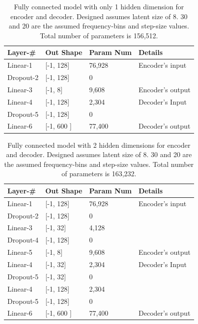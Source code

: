 \documentclass[runningheads,a4paper]{llncs}
\begin{document}
\begin{appendices}
\begin{table}
\begin{tabular}{|p{3cm}|p{3cm}|p{3cm}|p{3cm}|}
\hline
Layer-\# & Out Shape & Param Num & Details  \\ \hline
Linear-1 & [-1, 128]  & 76,928 & Encoder's input \\ \hline
Dropout-2 & [-1, 128] & 0 &  \\ \hline
Linear-3 & [-1, 8] & 9,608 & Encoder's output \\ \hline
Linear-4 & [-1, 128] & 2,304 & Decoder's Input \\ \hline
Dropout-5 & [-1, 128]  & 0 &  \\ \hline
Linear-6  & [-1, 600 ] &  77,400 &Decoder's output\\ \hline
\end{tabular}
\caption{Fully connected model with only 1 hidden dimension for encoder and decoder. Designed assumes latent size of 8. 30 and 20 are the assumed frequency-bins and step-size values. Total number of parameters is 156,512.}
\label{table:FC1_AUTOENCODER}
\end{table}

\begin{table}

\begin{tabular}{|p{3cm}|p{3cm}|p{3cm}|p{3cm}|}
\hline
Layer-\# & Out Shape & Param Num & Details  \\ \hline
Linear-1 & [-1, 128]  & 76,928 & Encoder's input \\ \hline
Dropout-2 & [-1, 128] & 0 &  \\ \hline
Linear-3 & [-1, 32]  & 4,128 & \\ \hline
Dropout-4 & [-1, 128] & 0 &  \\ \hline
Linear-5 & [-1, 8] & 9,608 & Encoder's output \\ \hline
Linear-4 & [-1, 32] & 2,304 & Decoder's Input \\ \hline
Dropout-5 & [-1, 32]  & 0 &  \\ \hline
Linear-4 & [-1, 128] & 2,304 & \\ \hline
Dropout-5 & [-1, 128]  & 0 &  \\ \hline
Linear-6  & [-1, 600 ] &  77,400 &Decoder's output\\ \hline
\end{tabular}
\caption{Fully connected model with 2 hidden dimensions for encoder and decoder. Designed assumes latent size of 8. 30 and 20 are the assumed frequency-bins and step-size values. Total number of parameters is 163,232.}
\label{table:FC2_AUTOENCODER}
\end{table}


\end{appendices}
\end{document}
